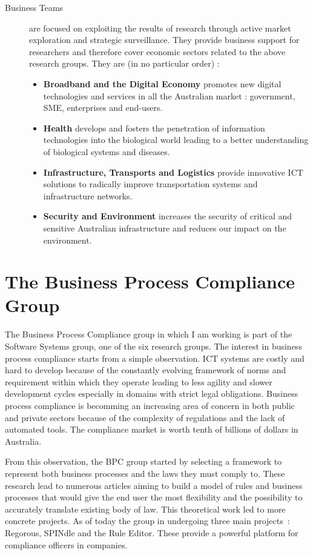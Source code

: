 \documentclass[10pt]{report}
\begin{document}
\begin{description}
\item[Business Teams] are focused on exploiting the results of research through active market exploration and strategic surveillance. They provide business support for researchers and therefore cover economic sectors related to the above research groups. They are (in no particular order) :
\begin{itemize}
\item \textbf{Broadband and the Digital Economy} promotes new digital technologies and services in all the Australian market : government, SME, enterprises and end-users.
\item \textbf{Health} develops and fosters the penetration of information technologies into the biological world leading to a better understanding of biological systems and diseases.
\item \textbf{Infrastructure, Transports and Logistics} provide innovative ICT solutions to radically improve transportation systems and infrastructure networks.
\item \textbf{Security and Environment} increases the security of critical and sensitive Australian infrastructure and reduces our impact on the environment.
\end{itemize}
\end{description}

\section{The Business Process Compliance Group}

The Business Process Compliance group in which I am working is part of the Software Systems group, one of the six research groups. The interest in business process compliance starts from a simple observation. ICT systems are costly and hard to develop because of the constantly evolving framework of norms and requirement within which they operate leading to less agility and slower development cycles especially in domains with strict legal obligations. Business process compliance is becomming an increasing area of concern in both public and private sectors because of the complexity of regulations and the lack of automated tools. The compliance market is worth tenth of billions of dollars in Australia.\autocite{BPCWebsite}

From this observation, the BPC group started by selecting a framework to represent both business processes and the laws they must comply to. These research lead to numerous articles aiming to build a model of rules and business processes that would give the end user the most flexibility and the possibility to accurately translate existing body of law. This theoretical work led to more concrete projects. As of today the group in undergoing three main projects~: Regorous, SPINdle and the Rule Editor. These provide a powerful platform for compliance officers in companies.
\end{document}

